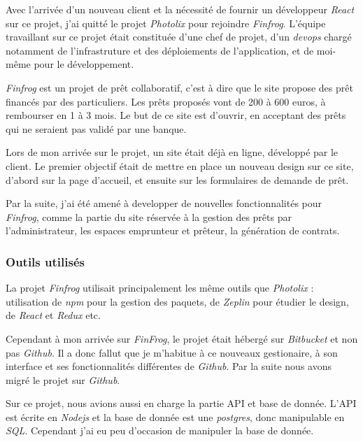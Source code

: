 \bigskip

Avec l'arrivée d'un nouveau client et la nécessité de fournir un
développeur \emph{React} sur ce projet, j'ai quitté le projet
\emph{Photolix} pour rejoindre \emph{Finfrog}. L'équipe travaillant sur
ce projet était constituée d'une chef de projet, d'un \emph{devops}
chargé notamment de l'infrastruture et des déploiements de
l'application, et de moi-même pour le développement.

\bigskip

\emph{Finfrog} est un projet de prêt collaboratif, c'est à dire que le
site propose des prêt financés par des particuliers. Les prêts proposés
vont de 200 à 600 euros, à rembourser en 1 à 3 mois. Le but de ce site
est d'ouvrir, en acceptant des prêts qui ne seraient pas validé par une
banque.

\bigskip

Lors de mon arrivée sur le projet, un site était déjà en ligne,
développé par le client. Le premier objectif était de mettre en place un
nouveau design sur ce site, d'abord sur la page d'accueil, et ensuite
sur les formulaires de demande de prêt.

\bigskip

Par la suite, j'ai été amené à developper de nouvelles fonctionnalités
pour \emph{Finfrog}, comme la partie du site réservée à la gestion des
prêts par l'administrateur, les espaces emprunteur et prêteur, la
génération de contrats.

\subsubsection{Outils utilisés}\label{outils-utilisuxe9s-1}

\bigskip

La projet \emph{Finfrog} utilisait principalement les même outils que
\emph{Photolix} : utilisation de \emph{npm} pour la gestion des paquets,
de \emph{Zeplin} pour étudier le design, de \emph{React} et \emph{Redux}
etc.

\bigskip

Cependant à mon arrivée sur \emph{FinFrog}, le projet était hébergé sur
\emph{Bitbucket} et non pas \emph{Github}. Il a donc fallut que je
m'habitue à ce nouveaux gestionaire, à son interface et ses
fonctionnalités différentes de \emph{Github}. Par la suite nous avons
migré le projet sur \emph{Github}.

\bigskip

Sur ce projet, nous avions aussi en charge la partie API et base de
donnée. L'API est écrite en \emph{Nodejs} et la base de donnée est une
\emph{postgres}, donc manipulable en \emph{SQL}. Cependant j'ai eu peu
d'occasion de manipuler la base de donnée.

